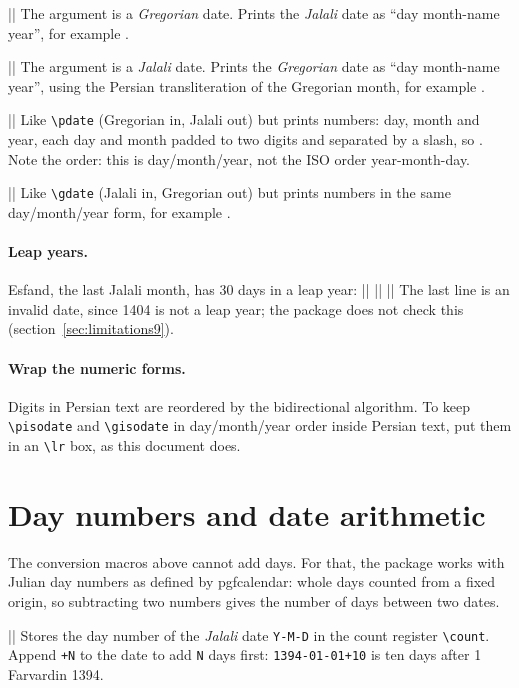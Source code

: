 \documentclass[11pt]{article}
\newcommand\iso[1]{\lr{#1}}            %
\newcommand\pkg[1]{\textsf{#1}}
\newcommand\cs[1]{\texttt{\textbackslash #1}}
\begin{document}
\macro||
The argument is a \emph{Gregorian} date. Prints the \emph{Jalali} date as ``day month-name year'',
for example .

\macro||
The argument is a \emph{Jalali} date. Prints the \emph{Gregorian} date as ``day month-name year'',
using the Persian transliteration of the Gregorian month, for example .

\macro||
Like \cs{pdate} (Gregorian in, Jalali out) but prints numbers: day, month and year, each day and
month padded to two digits and separated by a slash, so \iso{\pisodate{2024-03-20}}. Note the order:
this is day/month/year, not the ISO order year-month-day.

\macro||
Like \cs{gdate} (Jalali in, Gregorian out) but prints numbers in the same day/month/year form, for
example \iso{\gisodate{1403-01-01}}.

\paragraph{Leap years.} Esfand, the last Jalali month, has 30 days in a leap year:
\ex||{}
\ex||{}
\ex||{}
The last line is an invalid date, since 1404 is not a leap year; the package does not check this
(section~\ref{sec:limitations9}).

\paragraph{Wrap the numeric forms.} Digits in Persian text are reordered by the bidirectional
algorithm. To keep \cs{pisodate} and \cs{gisodate} in day/month/year order inside Persian text, put
them in an \cs{lr} box, as this document does.

\section{Day numbers and date arithmetic}\label{sec:day5}

The conversion macros above cannot add days. For that, the package works with Julian day numbers as
defined by \pkg{pgfcalendar}: whole days counted from a fixed origin, so subtracting two numbers gives
the number of days between two dates.

\macro||
Stores the day number of the \emph{Jalali} date \texttt{Y-M-D} in the count register \cs{count}. Append
\texttt{+N} to the date to add \texttt{N} days first: \texttt{1394-01-01+10} is ten days after
1 Farvardin 1394.
\end{document}
